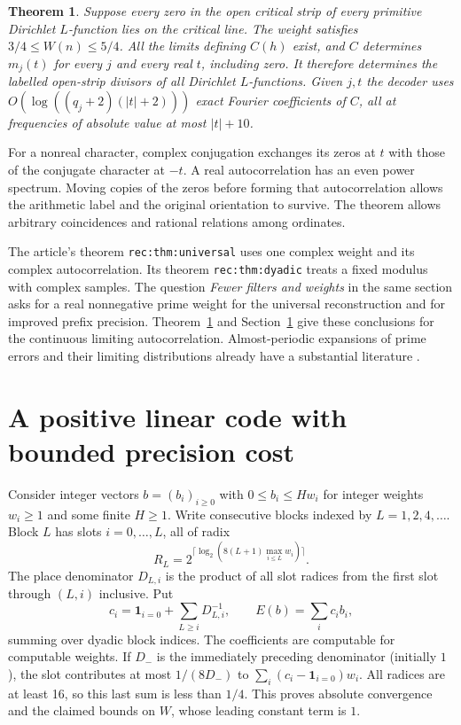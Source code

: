 \documentclass[11pt]{article}
\newtheorem{theorem}{Theorem}
\begin{document}
\begin{theorem}\label{t:main}
Suppose every zero in the open critical strip of every primitive Dirichlet $L$-function lies on the critical line. The weight satisfies $3/4\le W(n)\le5/4$. All the limits defining $C(h)$ exist, and $C$ determines $m_j(t)$ for every $j$ and every real $t$, including zero. It therefore determines the labelled open-strip divisors of all Dirichlet $L$-functions. Given $j,t$ the decoder uses $O(\log((q_j+2)(|t|+2)))$ exact Fourier coefficients of $C$, all at frequencies of absolute value at most $|t|+10$.
\end{theorem}

For a nonreal character, complex conjugation exchanges its zeros at $t$ with those of the conjugate character at $-t$. A real autocorrelation has an even power spectrum. Moving copies of the zeros before forming that autocorrelation allows the arithmetic label and the original orientation to survive. The theorem allows arbitrary coincidences and rational relations among ordinates.

The article's theorem \texttt{rec:thm:universal} \cite{repo} uses one complex weight and its complex autocorrelation. Its theorem \texttt{rec:thm:dyadic} treats a fixed modulus with complex samples. The question \emph{Fewer filters and weights} in the same section asks for a real nonnegative prime weight for the universal reconstruction and for improved prefix precision. Theorem~\ref{t:main} and Section~\ref{s:code} give these conclusions for the continuous limiting autocorrelation. Almost-periodic expansions of prime errors and their limiting distributions already have a substantial literature \cite{ans}.

\section{A positive linear code with bounded precision cost}\label{s:code}

Consider integer vectors $b=(b_i)_{i\ge0}$ with $0\le b_i\le H w_i$ for integer weights $w_i\ge1$ and some finite $H\ge1$. Write consecutive blocks indexed by $L=1,2,4,\ldots$. Block $L$ has slots $i=0,\ldots,L$, all of radix
\[
 R_L=2^{\lceil\log_2(8(L+1)\max_{i\le L}w_i)\rceil}.
\]
The place denominator $D_{L,i}$ is the product of all slot radices from the first slot through $(L,i)$ inclusive. Put
\begin{equation}\label{eq:code}
 c_i=\mathbf1_{i=0}+\sum_{L\ge i} D_{L,i}^{-1},\qquad E(b)=\sum_i c_i b_i ,
\end{equation}
summing over dyadic block indices. The coefficients are computable for computable weights. If $D_-$ is the immediately preceding denominator (initially $1$), the slot contributes at most $1/(8D_-)$ to $\sum_i(c_i-\mathbf1_{i=0})w_i$. All radices are at least 16, so this last sum is less than $1/4$. This proves absolute convergence and the claimed bounds on $W$, whose leading constant term is $1$.
\end{document}
